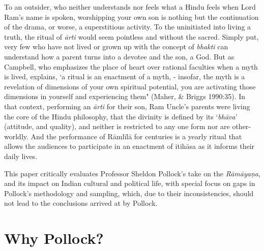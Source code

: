 \newpage

To an outsider, who neither understands nor feels what a Hindu feels when Lord Ram’s name is spoken, worshipping your own son is nothing but the continuation of the drama, or worse, a superstitious activity. To the uninitiated into living a truth, the ritual of \textit{ārti} would seem pointless and without the sacred. Simply put, very few who have not lived or grown up with the concept of \textit{bhakti} can understand how a parent turns into a devotee and the son, a God. But as Campbell, who emphasizes the place of heart over rational faculties when a myth is lived, explains, ‘a ritual is an enactment of a myth, - insofar, the myth is a revelation of dimensions of your own spiritual potential, you are activating those dimensions in yourself and experiencing them" (Maher, \& Briggs 1990:35). In that context, performing an \textit{ārti} for their son, Ram Uncle’s parents were living the core of the Hindu philosophy, that the divinity is defined by its ‘\textit{bhāva}’ (attitude, and quality), and neither is restricted to any one form nor are other-worldly. And the performance of Rāmlīlā for centuries is a yearly ritual that allows the audiences to participate in an enactment of itihāsa as it informs their daily lives.

This paper critically evaluates Professor Sheldon Pollock’s take on the \textit{Rāmāyaṇa}, and its impact on Indian cultural and political life, with special focus on gaps in Pollock’s methodology and sampling, which, due to their inconsistencies, should not lead to the conclusions arrived at by Pollock.


\section*{Why Pollock?}

